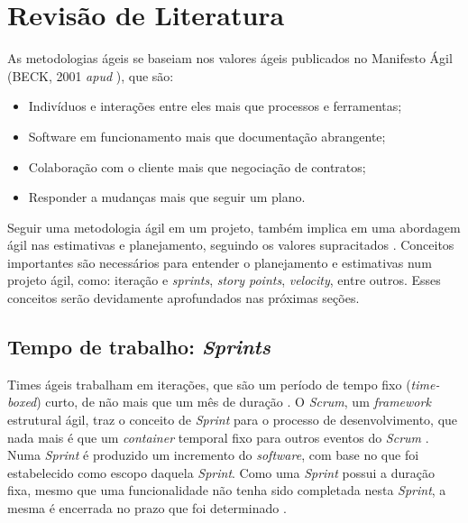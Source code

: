 \chapter{Revisão de Literatura}


  As metodologias ágeis se baseiam nos valores ágeis publicados no Manifesto Ágil
  (BECK, 2001 \textit{apud} ), que são:

  \begin{itemize}
   \item Indivíduos e interações entre eles mais que processos e ferramentas;
   \item Software em funcionamento mais que documentação abrangente;
   \item Colaboração com o cliente mais que negociação de contratos;
   \item Responder a mudanças mais que seguir um plano.
  \end{itemize}

 Seguir uma metodologia ágil em um projeto, também implica em uma abordagem ágil nas estimativas e planejamento, seguindo
 os valores supracitados \cite{cohn06}. Conceitos importantes são necessários para entender o planejamento e estimativas
 num projeto ágil, como: iteração e \textit{sprints}, \textit{story points}, \textit{velocity}, entre outros.
 Esses conceitos serão devidamente aprofundados nas próximas seções.

\section{Tempo de trabalho: \textit{Sprints}}

 Times ágeis trabalham em iterações, que são um período de tempo fixo (\textit{time-boxed}) curto, de não mais que
 um mês de duração \cite{cohn06} \cite{scrum13}. O \textit{Scrum}, um \textit{framework} estrutural ágil,
 traz o conceito de \textit{Sprint} para o processo de desenvolvimento, que nada mais é que um \textit{container}
 temporal fixo para outros eventos do \textit{Scrum} \cite{scrum13}. Numa \textit{Sprint} é produzido um incremento
 do \textit{software}, com base no que foi estabelecido como escopo daquela \textit{Sprint}. Como uma \textit{Sprint} possui
 a duração fixa, mesmo que uma funcionalidade não tenha sido completada nesta \textit{Sprint}, a mesma é encerrada no prazo
 que foi determinado \cite{cohn06}.

